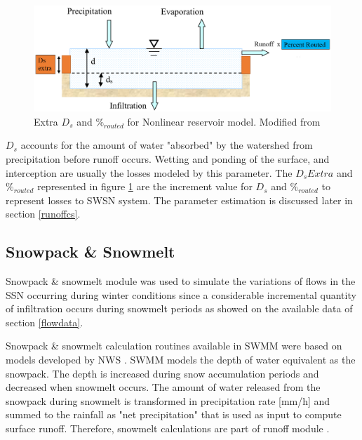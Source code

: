 \begin{figure}[ht]
    \centering
	\includegraphics[scale=0.5]{figures/runoffreservoirmod.png}
	\caption{Extra $D_s$ and $\%_{routed}$ for Nonlinear reservoir model. Modified from \citet{Rossman2016}}
	\label{fig:runoffreservoirmod}
\end{figure}

$D_s$ accounts for the amount of water "absorbed" by the watershed from precipitation before runoff occurs. Wetting and ponding of the surface, and interception are usually the losses modeled by this parameter. The $D_s Extra$ and $\%_{routed}$ represented in figure \ref{fig:runoffreservoirmod} are the increment value for $D_s$ and $\%_{routed}$  to represent losses to \ac{SWSN} system. The parameter estimation is discussed later in section \ref{runoffcs}.

\subsection{Snowpack \& Snowmelt} \label{snowlit}

Snowpack \& snowmelt module was used to simulate the variations of flows in the \acf{SSN} occurring during winter conditions since a considerable incremental quantity of infiltration occurs during snowmelt periods as showed on the available data of section \ref{flowdata}.

Snowpack \& snowmelt calculation routines available in SWMM were based on models developed by \acf{NWS} \cite{anderson1973,anderson2006}. SWMM models the depth of water equivalent as the snowpack. The depth is increased during snow accumulation periods and decreased when snowmelt occurs. The amount of water released from the snowpack during snowmelt is transformed in precipitation rate [mm/h] and summed to the rainfall as "net precipitation" that is used as input to compute surface runoff. Therefore, snowmelt calculations are part of runoff module \cite{Rossman2016}.

